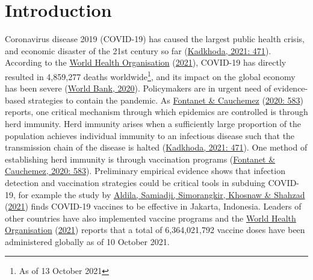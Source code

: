 \documentclass[11pt,preprint, authoryear]{elsarticle}
\numberwithin{equation}{section}
\numberwithin{figure}{section}
\numberwithin{table}{section}
\let\rmarkdownfootnote\footnote%
\def\footnote{\protect\rmarkdownfootnote}
\begin{document}
\renewcommand{\contentsname}{Table of Contents}
{\tableofcontents}

\pagestyle{fancy}
\chead{}
\rhead{}
\lfoot{}
\lhead{}
\cfoot{}


\headsep 35pt %




\newpage

\hypertarget{introduction}{%
\section{\texorpdfstring{Introduction
\label{Introduction}}{Introduction }}\label{introduction}}

Coronavirus disease 2019 (COVID-19) has caused the largest public health
crisis, and economic disaster of the 21st century so far
(\protect\hyperlink{ref-bad}{Kadkhoda, 2021: 471}). According to the
\protect\hyperlink{ref-who}{World Health Organisation}
(\protect\hyperlink{ref-who}{2021}), COVID-19 has directly resulted in
4,859,277 deaths worldwide\footnote{As of 13 October 2021}, and its
impact on the global economy has been severe
(\protect\hyperlink{ref-bank}{World Bank, 2020}). Policymakers are in
urgent need of evidence-based strategies to contain the pandemic. As
\protect\hyperlink{ref-immun}{Fontanet \& Cauchemez}
(\protect\hyperlink{ref-immun}{2020: 583}) reports, one critical
mechanism through which epidemics are controlled is through herd
immunity. Herd immunity arises when a sufficiently large proportion of
the population achieves individual immunity to an infectious disease
such that the transmission chain of the disease is halted
(\protect\hyperlink{ref-bad}{Kadkhoda, 2021: 471}). One method of
establishing herd immunity is through vaccination programs
(\protect\hyperlink{ref-immun}{Fontanet \& Cauchemez, 2020: 583}).
Preliminary empirical evidence shows that infection detection and
vaccination strategies could be critical tools in subduing COVID-19, for
example the study by \protect\hyperlink{ref-erad}{Aldila, Samiadji,
Simorangkir, Khosnaw \& Shahzad} (\protect\hyperlink{ref-erad}{2021})
finds COVID-19 vaccines to be effective in Jakarta, Indonesia. Leaders
of other countries have also implemented vaccine programs and the
\protect\hyperlink{ref-who}{World Health Organisation}
(\protect\hyperlink{ref-who}{2021}) reports that a total of
6,364,021,792 vaccine doses have been administered globally as of 10
October 2021.
\end{document}
